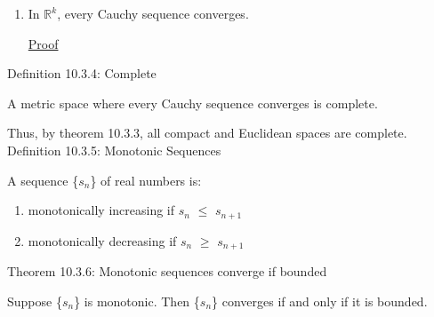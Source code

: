 \begin{enumerate}[label=(\alph*), leftmargin=2cm, itemsep=0.1cm]
        \item In $\mathbb{R}^k$, every Cauchy sequence converges.
        
            { \color{magenta} \underline{Proof} }

    \end{enumerate}

\newpage

{ \color{blue} Definition 10.3.4: Complete } 

	\begin{adjustbox}{minipage=14cm, right, vspace=0.1cm 0cm}
		A metric space where every Cauchy sequence converges is complete.

		Thus, by {\color{red} theorem 10.3.3}, all compact and Euclidean
		spaces are complete. \\
	\end{adjustbox}

{ \color{blue} Definition 10.3.5: Monotonic Sequences } 

	\begin{adjustbox}{minipage=14cm, right, vspace=0.1cm 0cm}
		A sequence \{$s_n$\} of real numbers is:
	\end{adjustbox}

	\begin{enumerate}[label=(\alph*), leftmargin=2cm, itemsep=0.1cm]
		\item monotonically increasing if $s_n$ $\leq$ $s_{n+1}$
		
		\item monotonically decreasing if $s_n$ $\geq$ $s_{n+1}$ \\
	\end{enumerate}

{ \color{red} Theorem 10.3.6: Monotonic sequences converge if bounded } 

	\begin{adjustbox}{minipage=14cm, right, vspace=0.1cm 0cm}
		Suppose \{$s_n$\} is monotonic. Then \{$s_n$\} converges if
		and only if it is bounded.
	\end{adjustbox}

